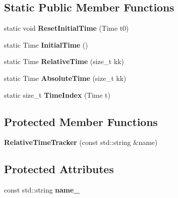 \subsection*{Static Public Member Functions}
\begin{DoxyCompactItemize}
\item 
static void {\bfseries Reset\+Initial\+Time} (Time t0)\hypertarget{classilqgames_1_1_relative_time_tracker_abe976652bb51591cf72e027a7d1e9aee}{}\label{classilqgames_1_1_relative_time_tracker_abe976652bb51591cf72e027a7d1e9aee}

\item 
static Time {\bfseries Initial\+Time} ()\hypertarget{classilqgames_1_1_relative_time_tracker_a13fe3e78dde6915c8916751b11f24387}{}\label{classilqgames_1_1_relative_time_tracker_a13fe3e78dde6915c8916751b11f24387}

\item 
static Time {\bfseries Relative\+Time} (size\+\_\+t kk)\hypertarget{classilqgames_1_1_relative_time_tracker_a728a190699f5e5fca32e0856949a7e23}{}\label{classilqgames_1_1_relative_time_tracker_a728a190699f5e5fca32e0856949a7e23}

\item 
static Time {\bfseries Absolute\+Time} (size\+\_\+t kk)\hypertarget{classilqgames_1_1_relative_time_tracker_a8ae4795299a6ea1e122d02642380ca0a}{}\label{classilqgames_1_1_relative_time_tracker_a8ae4795299a6ea1e122d02642380ca0a}

\item 
static size\+\_\+t {\bfseries Time\+Index} (Time t)\hypertarget{classilqgames_1_1_relative_time_tracker_a4a6ef106de011f3b7a4c9b502ce9faba}{}\label{classilqgames_1_1_relative_time_tracker_a4a6ef106de011f3b7a4c9b502ce9faba}

\end{DoxyCompactItemize}
\subsection*{Protected Member Functions}
\begin{DoxyCompactItemize}
\item 
{\bfseries Relative\+Time\+Tracker} (const std\+::string \&name)\hypertarget{classilqgames_1_1_relative_time_tracker_abb803cf6f36fc9b8e0c6178d3d4a7894}{}\label{classilqgames_1_1_relative_time_tracker_abb803cf6f36fc9b8e0c6178d3d4a7894}

\end{DoxyCompactItemize}
\subsection*{Protected Attributes}
\begin{DoxyCompactItemize}
\item 
const std\+::string {\bfseries name\+\_\+}\hypertarget{classilqgames_1_1_relative_time_tracker_ae663f7a3181bcf65f3e81428613e3470}{}\label{classilqgames_1_1_relative_time_tracker_ae663f7a3181bcf65f3e81428613e3470}

\end{DoxyCompactItemize}
